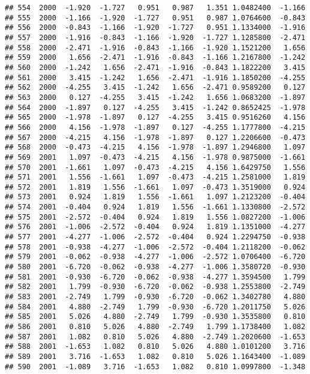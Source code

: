 \documentclass[]{article}
\begin{document}
\begin{verbatim}
## 554  2000  -1.920  -1.727   0.951   0.987   1.351 1.0482400  -1.166
## 555  2000  -1.166  -1.920  -1.727   0.951   0.987 1.0764600  -0.843
## 556  2000  -0.843  -1.166  -1.920  -1.727   0.951 1.1334000  -1.916
## 557  2000  -1.916  -0.843  -1.166  -1.920  -1.727 1.1285800  -2.471
## 558  2000  -2.471  -1.916  -0.843  -1.166  -1.920 1.1521200   1.656
## 559  2000   1.656  -2.471  -1.916  -0.843  -1.166 1.2167800  -1.242
## 560  2000  -1.242   1.656  -2.471  -1.916  -0.843 1.1822200   3.415
## 561  2000   3.415  -1.242   1.656  -2.471  -1.916 1.1850200  -4.255
## 562  2000  -4.255   3.415  -1.242   1.656  -2.471 0.9589200   0.127
## 563  2000   0.127  -4.255   3.415  -1.242   1.656 1.0683200  -1.897
## 564  2000  -1.897   0.127  -4.255   3.415  -1.242 0.8652425  -1.978
## 565  2000  -1.978  -1.897   0.127  -4.255   3.415 0.9516260   4.156
## 566  2000   4.156  -1.978  -1.897   0.127  -4.255 1.1777800  -4.215
## 567  2000  -4.215   4.156  -1.978  -1.897   0.127 1.2206600  -0.473
## 568  2000  -0.473  -4.215   4.156  -1.978  -1.897 1.2946800   1.097
## 569  2001   1.097  -0.473  -4.215   4.156  -1.978 0.9875000  -1.661
## 570  2001  -1.661   1.097  -0.473  -4.215   4.156 1.6429750   1.556
## 571  2001   1.556  -1.661   1.097  -0.473  -4.215 1.2581000   1.819
## 572  2001   1.819   1.556  -1.661   1.097  -0.473 1.3519000   0.924
## 573  2001   0.924   1.819   1.556  -1.661   1.097 1.2123200  -0.404
## 574  2001  -0.404   0.924   1.819   1.556  -1.661 1.1330800  -2.572
## 575  2001  -2.572  -0.404   0.924   1.819   1.556 1.0827200  -1.006
## 576  2001  -1.006  -2.572  -0.404   0.924   1.819 1.1351000  -4.277
## 577  2001  -4.277  -1.006  -2.572  -0.404   0.924 1.2294750  -0.938
## 578  2001  -0.938  -4.277  -1.006  -2.572  -0.404 1.2118200  -0.062
## 579  2001  -0.062  -0.938  -4.277  -1.006  -2.572 1.0706400  -6.720
## 580  2001  -6.720  -0.062  -0.938  -4.277  -1.006 1.3580720  -0.930
## 581  2001  -0.930  -6.720  -0.062  -0.938  -4.277 1.3594500   1.799
## 582  2001   1.799  -0.930  -6.720  -0.062  -0.938 1.2553800  -2.749
## 583  2001  -2.749   1.799  -0.930  -6.720  -0.062 1.3402780   4.880
## 584  2001   4.880  -2.749   1.799  -0.930  -6.720 1.2011750   5.026
## 585  2001   5.026   4.880  -2.749   1.799  -0.930 1.3535800   0.810
## 586  2001   0.810   5.026   4.880  -2.749   1.799 1.1738400   1.082
## 587  2001   1.082   0.810   5.026   4.880  -2.749 1.2020600  -1.653
## 588  2001  -1.653   1.082   0.810   5.026   4.880 1.0101200   3.716
## 589  2001   3.716  -1.653   1.082   0.810   5.026 1.1643400  -1.089
## 590  2001  -1.089   3.716  -1.653   1.082   0.810 1.0997800  -1.348

\end{verbatim}
\end{document}
